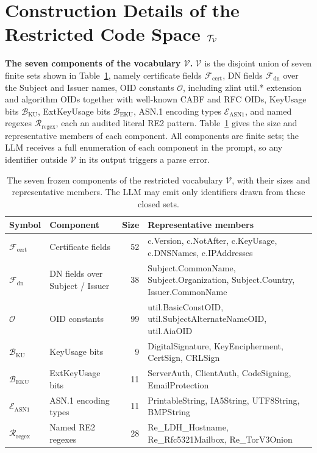 \section{Construction Details of the Restricted Code Space $\mathcal{T}_{\mathcal{V}}$}
\label{app:tv}

\textbf{The seven components of the vocabulary $\mathcal{V}$.} $\mathcal{V}$ is
the disjoint union of seven finite sets
shown in Table~\ref{tab:vocab}, namely certificate fields $\mathcal{F}_{\mathrm{cert}}$,
DN fields $\mathcal{F}_{\mathrm{dn}}$ over the Subject and Issuer names, OID
constants $\mathcal{O}$, including zlint util.* extension and algorithm OIDs
together with well-known CABF and RFC OIDs, KeyUsage bits $\mathcal{B}_{\mathrm{KU}}$,
ExtKeyUsage bits $\mathcal{B}_{\mathrm{EKU}}$, ASN.1 encoding types
$\mathcal{E}_{\mathrm{ASN1}}$, and named regexes $\mathcal{R}_{\mathrm{regex}}$,
each an audited literal RE2 pattern. Table~\ref{tab:vocab} gives the size and
representative members of each component.
All components are finite sets; the LLM receives a full enumeration of
each component in the prompt, so any identifier outside $\mathcal{V}$ in its
output triggers a parse error.

\begin{table}[tb]
\centering
\footnotesize
\caption{The seven frozen components of the restricted vocabulary $\mathcal{V}$,
with their sizes and representative members. The LLM may emit only identifiers
drawn from these closed sets.}
\label{tab:vocab}
\begin{tabularx}{\textwidth}{@{}l l r X@{}}
\toprule
Symbol & Component & Size & Representative members \\
\midrule
$\mathcal{F}_{\mathrm{cert}}$ & Certificate fields & 52 &
  c.Version, c.NotAfter, c.KeyUsage, c.DNSNames, c.IPAddresses \\
$\mathcal{F}_{\mathrm{dn}}$ & DN fields over Subject / Issuer & 38 &
  Subject.CommonName, Subject.Organization, Subject.Country, Issuer.CommonName \\
$\mathcal{O}$ & OID constants & 99 &
  util.BasicConstOID, util.SubjectAlternateNameOID, util.AiaOID \\
$\mathcal{B}_{\mathrm{KU}}$ & KeyUsage bits & 9 &
  DigitalSignature, KeyEncipherment, CertSign, CRLSign \\
$\mathcal{B}_{\mathrm{EKU}}$ & ExtKeyUsage bits & 11 &
  ServerAuth, ClientAuth, CodeSigning, EmailProtection \\
$\mathcal{E}_{\mathrm{ASN1}}$ & ASN.1 encoding types & 11 &
  PrintableString, IA5String, UTF8String, BMPString \\
$\mathcal{R}_{\mathrm{regex}}$ & Named RE2 regexes & 28 &
  Re\_LDH\_Hostname, Re\_Rfc5321Mailbox, Re\_TorV3Onion \\
\bottomrule
\end{tabularx}
\end{table}

